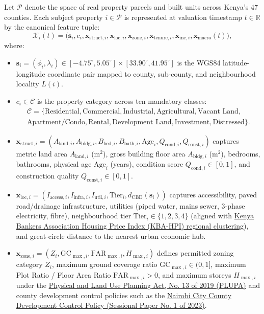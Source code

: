\documentclass[11pt,a4paper]{article}
\begin{document}
Let $\mathcal{P}$ denote the space of real property parcels and built units across Kenya's 47 counties. Each subject property $i \in \mathcal{P}$ is represented at valuation timestamp $t \in \mathbb{R}$ by the canonical feature tuple:
\begin{equation}
    \mathcal{X}_i(t) = \bigl(\mathbf{s}_i, c_i, \mathbf{x}_{\text{struct},i}, \mathbf{x}_{\text{loc},i}, \mathbf{x}_{\text{zone},i}, \mathbf{x}_{\text{tenure},i}, \mathbf{x}_{\text{inc},i}, \mathbf{x}_{\text{macro}}(t)\bigr),
\end{equation}
where:
\begin{itemize}
    \item $\mathbf{s}_i = (\phi_i, \lambda_i) \in [-4.75^\circ, 5.05^\circ] \times [33.90^\circ, 41.95^\circ]$ is the WGS84 latitude-longitude coordinate pair mapped to county, sub-county, and neighbourhood locality $L(i)$.
    \item $c_i \in \mathcal{C}$ is the property category across ten mandatory classes:
    \begin{multline*}
        \mathcal{C} = \{\text{Residential}, \text{Commercial}, \text{Industrial}, \text{Agricultural}, \text{Vacant Land},\\
        \text{Apartment/Condo}, \text{Rental}, \text{Development Land}, \text{Investment}, \text{Distressed}\}.
    \end{multline*}
    \item $\mathbf{x}_{\text{struct},i} = (A_{\text{land},i}, A_{\text{bldg},i}, B_{\text{bed},i}, B_{\text{bath},i}, \text{Age}_i, Q_{\text{cond},i}, Q_{\text{const},i})$ captures metric land area $A_{\text{land},i}$ ($\text{m}^2$), gross building floor area $A_{\text{bldg},i}$ ($\text{m}^2$), bedrooms, bathrooms, physical age $\text{Age}_i$ (years), condition score $Q_{\text{cond},i} \in [0,1]$, and construction quality $Q_{\text{const},i} \in [0,1]$.
    \item $\mathbf{x}_{\text{loc},i} = (I_{\text{access},i}, I_{\text{infra},i}, I_{\text{util},i}, \text{Tier}_i, d_{\text{CBD}}(\mathbf{s}_i))$ captures accessibility, paved road/drainage infrastructure, utilities (piped water, mains sewer, 3-phase electricity, fibre), neighbourhood tier $\text{Tier}_i \in \{1,2,3,4\}$ (aligned with \href{https://www.kba.co.ke/house-prices-drop-eases-homeownership-creates-challenges-for-developers/}{Kenya Bankers Association Housing Price Index (KBA-HPI) regional clustering}), and great-circle distance to the nearest urban economic hub.
    \item $\mathbf{x}_{\text{zone},i} = (Z_i, \text{GC}_{\max,i}, \text{FAR}_{\max,i}, H_{\max,i})$ defines permitted zoning category $Z_i$, maximum ground coverage ratio $\text{GC}_{\max,i} \in (0,1]$, maximum Plot Ratio / Floor Area Ratio $\text{FAR}_{\max,i} > 0$, and maximum storeys $H_{\max,i}$ under the \href{https://kara.or.ke/wp-content/uploads/2024/11/PhysicalandLandUsePlanningAct13of2019.pdf}{Physical and Land Use Planning Act, No. 13 of 2019 (PLUPA)} and county development control policies such as the \href{https://nairobiassembly.go.ke/ncca/wp-content/uploads/paperlaid/2023/SESSIONAL-PAPER-NO.-1-OF-2023-ON-NAIROBI-CITY-COUNTY-DEVELOPMENT-CONTROL-POLICY.pdf}{Nairobi City County Development Control Policy (Sessional Paper No. 1 of 2023)}.

\end{itemize}
\end{document}
